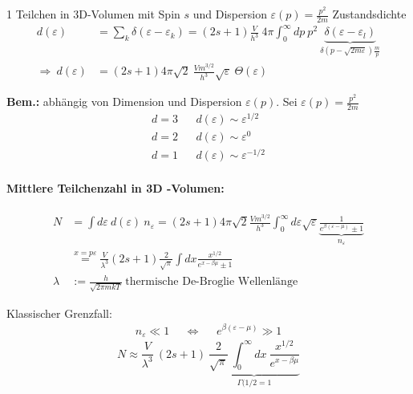 \begin{beispiel}{1 Teilchen in 3D-Volumen mit Spin $s$ und Dispersion $\varepsilon(p) = \frac{p^2}{2m}$}
    Zustandsdichte
    \begin{align}
        d(\varepsilon) & = \sum_k \delta(\varepsilon-\varepsilon_k) = (2s+1) \frac{V}{h^3} \ 4\pi \int_0^\infty dp \ p^2 \ \underbrace{\delta(\varepsilon-\varepsilon_l) }_{\delta(p-\sqrt{2m\varepsilon}) \frac{m}{p}}\\
      \Rightarrow \ d(\varepsilon)  &= (2s+1) 4\pi \sqrt{2} \ \frac{V m^{3/2}}{h^3} \sqrt{\varepsilon} \ \Theta(\varepsilon)
    \end{align}
        
  \textbf{Bem.:} abhängig von Dimension und Dispersion $\varepsilon(p)$. Sei $\varepsilon(p) = \frac{p^2}{2m}$ 
    \begin{align}
        d=3 && d(\varepsilon) \sim \varepsilon^{1/2}\\
        d=2 && d(\varepsilon) \sim \varepsilon^{0}\\
        d=1 && d(\varepsilon) \sim \varepsilon^{-1/2}
    \end{align}
\end{beispiel}


\paragraph{Mittlere Teilchenzahl in 3D -Volumen:}
\begin{align}
    N &= \int d\varepsilon \ d(\varepsilon) \ n_\varepsilon = (2s+1)4\pi \sqrt{2} \frac{V m^{3/2}}{h^3} \int_0^\infty d\varepsilon \sqrt{\varepsilon} \underbrace{\frac{1}{e^{\beta (\varepsilon-\mu)} \pm 1}}_{n_\varepsilon} \\
    &\overset{x=p\varepsilon}{=} \frac{V}{\lambda^3} (2s+1)\frac{2}{\sqrt{\pi}} \int dx \frac{x^{1/2}}{e^{x-\beta\mu} \pm 1}\\
    \lambda &:= \frac{h}{\sqrt{2\pi mkT}} \ \text{thermische De-Broglie Wellenlänge}
\end{align}

Klassischer Grenzfall:
 \begin{align}
     n_\varepsilon \ll 1 && \Leftrightarrow && e^{\beta(\varepsilon-\mu) } \gg 1
 \end{align}
\begin{equation}
    N \approx \frac{V}{\lambda^3} \ (2s+1)  \ \underbrace{\frac{2}{\sqrt{\pi}}\  \int_0^\infty dx \ \frac{x^{1/2}}{e^{x-\beta\mu}}}_{\Gamma(1/2 =1}
\end{equation}

